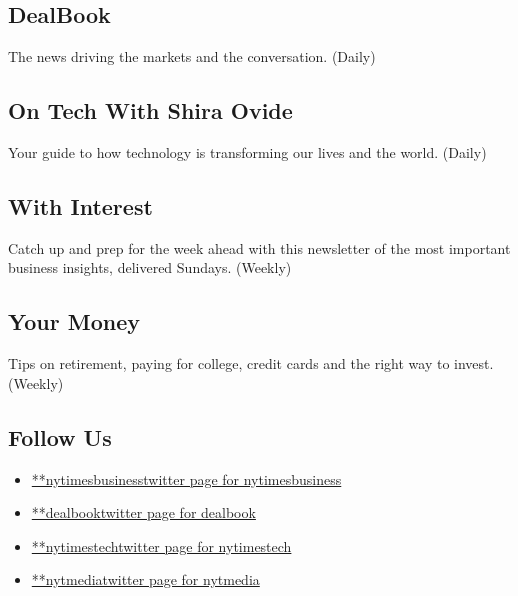 \hypertarget{dealbook}{%
\subsection{DealBook}\label{dealbook}}

The news driving the markets and the conversation. (Daily)

\hypertarget{on-tech-with-shira-ovide}{%
\subsection{On Tech With Shira Ovide}\label{on-tech-with-shira-ovide}}

Your guide to how technology is transforming our lives and the world.
(Daily)

\hypertarget{with-interest}{%
\subsection{With Interest}\label{with-interest}}

Catch up and prep for the week ahead with this newsletter of the most
important business insights, delivered Sundays. (Weekly)

\hypertarget{your-money}{%
\subsection{Your Money}\label{your-money}}

Tips on retirement, paying for college, credit cards and the right way
to invest. (Weekly)

\hypertarget{follow-us}{%
\subsection{Follow Us}\label{follow-us}}

\begin{itemize}
\tightlist
\item
  \href{https://twitter.com/nytimesbusiness}{**nytimesbusinesstwitter
  page for nytimesbusiness}
\item
  \href{https://twitter.com/dealbook}{**dealbooktwitter page for
  dealbook}
\item
  \href{https://twitter.com/nytimestech}{**nytimestechtwitter page for
  nytimestech}
\item
  \href{https://twitter.com/nytmedia}{**nytmediatwitter page for
  nytmedia}
\end{itemize}

